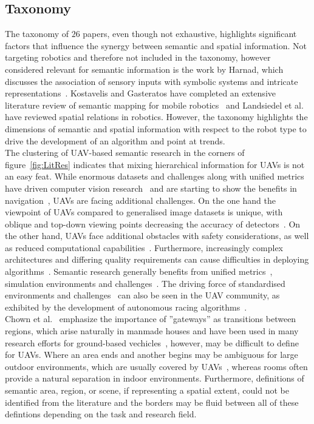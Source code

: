 \documentclass[twocolumn,letterpaper]{IEEEAerospaceCLS}  %
\begin{document}
\subsection{Taxonomy} \label{ssec:DiscLit}
The taxonomy of $26$ papers, even though not exhaustive, highlights significant factors that influence the synergy between semantic and spatial information. Not targeting robotics and therefore not included in the taxonomy, however considered relevant for semantic information is the work by Harnad, which discusses the association of sensory inputs with symbolic systems and intricate representations~\cite{harnad_symbol_1990}. Kostavelis and Gasteratos have completed an extensive literature review of semantic mapping for mobile robotics~\cite{kostavelis_semantic_2015} and Landsiedel et al.~\cite{landsiedel_review_2017} have reviewed spatial relations in robotics. However, the taxonomy highlights the dimensions of semantic and spatial information with respect to the robot type to drive the development of an algorithm and point at trends.\\
The clustering of UAV-based semantic research in the corners of figure~\ref{fig:LitRes} indicates that mixing hierarchical information for UAVs is not an easy feat. While enormous datasets and challenges along with unified metrics have driven computer vision research~\cite{alom_history_2018,corke_what_2020} and are starting to show the benefits in navigation~\cite{anderson_evaluation_2018,chaplot_object_2020}, UAVs are facing additional challenges.
On the one hand the viewpoint of UAVs compared to generalised image datasets is unique, with oblique and top-down viewing points decreasing the accuracy of detectors~\cite{richardwebster_psyphy:_2019}. On the other hand, UAVs face additional obstacles with safety considerations, as well as reduced computational capabilities~\cite{boroujerdian_mavbench_2018,mandel_method_2020}. Furthermore, increasingly complex architectures and differing quality requirements can cause difficulties in deploying algorithms~\cite{cervera_try_2019,malatova_how_2020}. 
Semantic research generally benefits from unified metrics~\cite{anderson_evaluation_2018}, simulation environments and challenges~\cite{chaplot_object_2020,yang_visual_2018}. The driving force of standardised environments and challenges~\cite{corke_what_2020} can also be seen in the UAV community, as exhibited by the development of autonomous racing algorithms~\cite{moon_challenges_2019}.\\
Chown et al.~\cite{chown_prototypes_1995} emphasize the importance of ''gateways'' as transitions between regions, which arise naturally in manmade houses and have been used in many research efforts for ground-based vechicles~\cite{kuipers_local_2004,wu_learning_2018,krishnan_visual_2010}, however, may be difficult to define for UAVs. Where an area ends and another begins may be ambiguous for large outdoor environments, which are usually covered by UAVs~\cite{vanegas_novel_2018,shetty_implementation_2020}, whereas rooms often provide a natural separation in indoor environments. Furthermore, definitions of semantic area, region, or scene, if representing a spatial extent, could not be identified from the literature and the borders may be fluid between all of these defintions depending on the task and research field.
\end{document}
